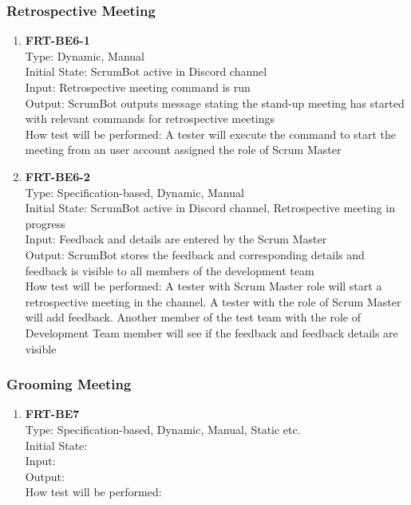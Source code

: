 \documentclass[12pt, titlepage]{article}
\begin{document}
\subsubsection{Retrospective Meeting}

\begin{enumerate}
    \item{\textbf{FRT-BE6-1}}\\
    Type: Dynamic, Manual\\
    Initial State: ScrumBot active in Discord channel\\
    Input: Retrospective meeting command is run\\
    Output: ScrumBot outputs message stating the stand-up meeting has started with relevant commands for retrospective meetings\\
    How test will be performed: A tester will execute the command to start the meeting from an user account assigned the role of Scrum Master\\
    
    \item{\textbf{FRT-BE6-2}}\\
    Type: Specification-based, Dynamic, Manual\\
    Initial State: ScrumBot active in Discord channel, Retrospective meeting in progress\\
    Input: Feedback and details are entered by the Scrum Master\\
    Output: ScrumBot stores the feedback and corresponding details and feedback is visible to all members of the development team\\
    How test will be performed: A tester with Scrum Master role will start a retrospective meeting in the channel. A tester with the role of Scrum Master will add feedback. Another member of the test team with the role of Development Team member will see if the feedback and feedback details are visible\\
\end{enumerate}

\subsubsection{Grooming Meeting}

\begin{enumerate}
    \item{\textbf{FRT-BE7}}\\
    Type: Specification-based, Dynamic, Manual, Static etc.\\
    Initial State: \\
    Input: \\
    Output: \\
    How test will be performed: \\
\end{enumerate}
\end{document}
